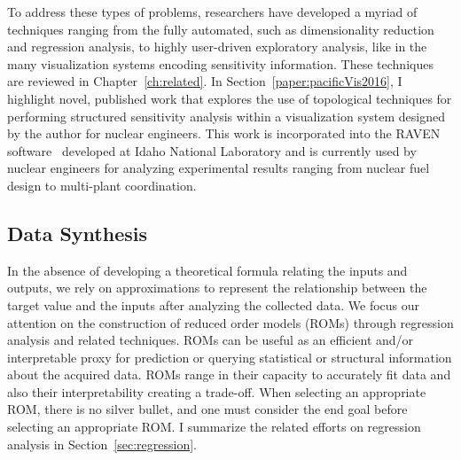 To address these types of problems, researchers have developed a myriad of techniques ranging from the fully automated, such as dimensionality reduction and regression analysis, to highly user-driven exploratory analysis, like in the many visualization systems encoding sensitivity information.
%
These techniques are reviewed in Chapter~\ref{ch:related}.
%
In Section~\ref{paper:pacificVis2016}, I highlight novel, published work that explores the use of topological techniques for performing structured sensitivity analysis within a visualization system designed by the author for nuclear engineers.
%
This work is incorporated into the RAVEN software~\cite{RabitiAlfonsiCogliati2015} developed at Idaho National Laboratory and is currently used by nuclear engineers for analyzing experimental results ranging from nuclear fuel design to multi-plant coordination.

\subsection{Data Synthesis}

In the absence of developing a theoretical formula relating the inputs and outputs, we rely on approximations to represent the relationship between the target value and the inputs after analyzing the collected data.
%
We focus our attention on the construction of reduced order models (ROMs) through regression analysis and related techniques.
%
ROMs can be useful as an efficient and/or interpretable proxy for prediction or querying statistical or structural information about the acquired data.
%
ROMs range in their capacity to accurately fit data and also their interpretability creating a trade-off.
%
When selecting an appropriate ROM, there is no silver bullet, and one must consider the end goal before selecting an appropriate ROM.
%
I summarize the related efforts on regression analysis in Section~\ref{sec:regression}.

% 